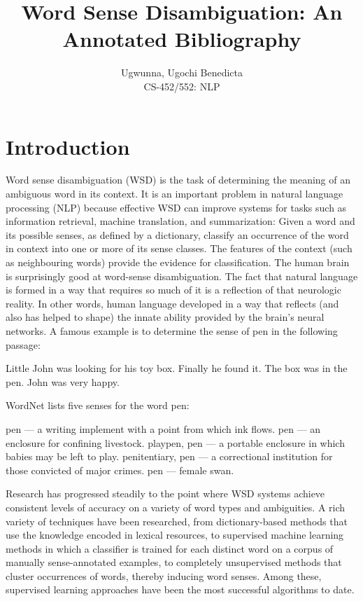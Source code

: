 \documentclass[11pt]{article}
\title{Word Sense Disambiguation: An Annotated Bibliography}
\author{Ugwunna, Ugochi Benedicta \\ CS-452/552: NLP}
\begin{document}
\maketitle
\tableofcontents
\thispagestyle{empty}

\newpage

\section{Introduction}

Word sense disambiguation (WSD) is the task of determining the meaning of an ambiguous word in its context. It is an important problem in natural language processing (NLP) because effective WSD can improve systems for tasks such as information retrieval, machine translation, and summarization: Given a word and its possible senses, as defined by a dictionary, classify an occurrence of the word in context into one or more of its sense classes. The features of the context (such as neighbouring words) provide the evidence for classification.
The human brain is surprisingly good at word-sense disambiguation. The fact that natural language is formed in a way that requires so much of it is a reflection of that neurologic reality. In other words, human language developed in a way that reflects (and also has helped to shape) the innate ability provided by the brain's neural networks.
A famous example is to determine the sense of pen in the following passage:

Little John was looking for his toy box. Finally he found it. The box was in the pen. John was very happy.

WordNet lists five senses for the word pen:

	pen — a writing implement with a point from which ink flows.
	pen — an enclosure for confining livestock.
	playpen, pen — a portable enclosure in which babies may be left to play.
	penitentiary, pen — a correctional institution for those convicted of major crimes.
	pen — female swan.
	
	
Research has progressed steadily to the point where WSD systems achieve consistent levels of accuracy on a variety of word types and ambiguities. A rich variety of techniques have been researched, from dictionary-based methods that use the knowledge encoded in lexical resources, to supervised machine learning methods in which a classifier is trained for each distinct word on a corpus of manually sense-annotated examples, to completely unsupervised methods that cluster occurrences of words, thereby inducing word senses. Among these, supervised learning approaches have been the most successful algorithms to date.
\end{document}
